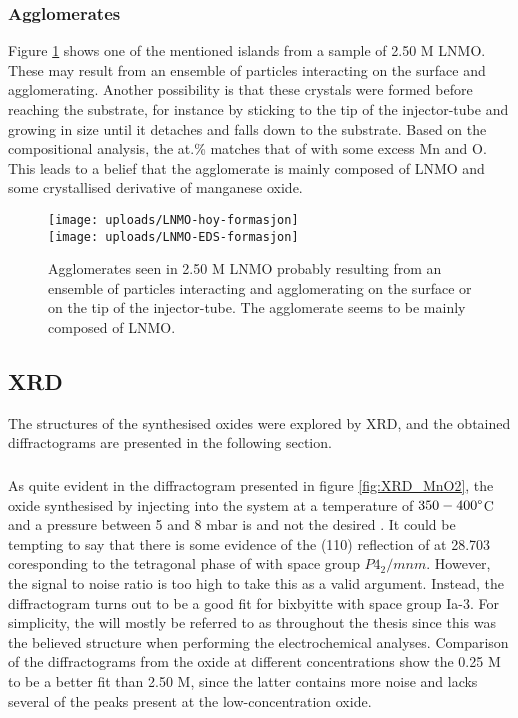 \documentclass[Main/main.tex]{subfiles}
\begin{document}
\subsubsection{Agglomerates}
Figure \ref{fig:formasjon} shows one of the mentioned islands from a sample of 2.50 M LNMO. These may result from an ensemble of particles interacting on the surface and agglomerating. Another possibility is that these crystals were formed before reaching the substrate, for instance by sticking to the tip of the injector-tube and growing in size until it detaches and falls down to the substrate. Based on the compositional analysis, the at.\% matches that of  with some excess Mn and O. This leads to a belief that the agglomerate is mainly composed of LNMO and some crystallised derivative of manganese oxide.
\begin{figure}[ht]
    \centering
	\texttt{[image: uploads/LNMO-hoy-formasjon]} \\ \texttt{[image: uploads/LNMO-EDS-formasjon]}
	\caption{Agglomerates seen in 2.50 M LNMO probably resulting from an ensemble of particles interacting and agglomerating on the surface or on the tip of the injector-tube. The agglomerate seems to be mainly composed of LNMO.}
	\label{fig:formasjon}
\end{figure}








\FloatBarrier
\subsection{XRD}
The structures of the synthesised oxides were explored by XRD, and the obtained diffractograms are presented in the following section.  

\subsubsection{}
As quite evident in the diffractogram presented in figure \ref{fig:XRD_MnO2}, the oxide synthesised by injecting  into the system at a temperature of $350-400 \degree$C and a pressure between 5 and 8 \si{mbar} is  and not the desired . It could be tempting to say that there is some evidence of the (110) reflection of  at 28.703 \degree coresponding to the tetragonal phase of  with space group $P4_2/mnm$. However, the signal to noise ratio is too high to take this as a valid argument.
Instead, the diffractogram turns out to be a good fit for  bixbyitte with space group Ia-3. 
For simplicity, the  will mostly be referred to as  throughout the thesis since this was the believed structure when performing the electrochemical analyses. 
Comparison of the diffractograms from the oxide at different concentrations show the 0.25 M to be a better fit than 2.50 M, since the latter contains more noise and lacks several of the peaks present at the low-concentration oxide.
\end{document}
